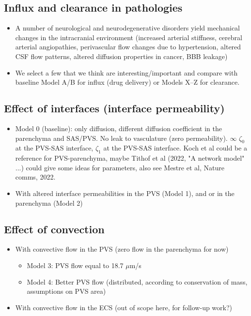 \documentclass[fleqn,10pt]{wlscirep}
\newcommand{\draft}[1]{\textcolor{gray}{#1}}
\begin{document}
\draft{\lipsum[1]}

\subsection*{Influx and clearance in pathologies}

\begin{itemize}
\item
  A number of neurological and neurodegenerative disorders yield mechanical changes in the intracranial environment (increased arterial stiffness, cerebral arterial angiopathies, perivascular flow changes due to hypertension, altered CSF flow patterns, altered diffusion properties in cancer, BBB leakage) 
\item
  We select a few that we think are interesting/important and compare with baseline Model A/B for influx (drug delivery) or Models X--Z for clearance.
\end{itemize}

\draft{\lipsum[1]}



\iffalse
\newpage
\subsection*{Effect of interfaces (interface permeability)}

\begin{itemize}
    \item Model 0 (baseline): only diffusion, different diffusion coefficient in the parenchyma and SAS/PVS. No leak to vasculature (zero permeability). $\infty$ $\zeta_0$ at the PVS-SAS interface, $\zeta_1$ at the PVS-SAS interface. Koch et al could be a reference for PVS-parenchyma, maybe Tithof et al (2022, "A network model" ...) could give some ideas for parameters, also see Mestre et al, Nature comms, 2022. 
    \item 
    With altered interface permeabilities in the PVS (Model 1), and or in the parenchyma (Model 2) 
    \end{itemize}

\begin{figure}
    \caption{}
    \label{fig:1}
\end{figure}

\subsection*{Effect of convection}
\begin{itemize}
    \item 
    With convective flow in the PVS (zero flow in the parenchyma for now)
    \begin{itemize}
        \item 
        Model 3: PVS flow equal to 18.7 $\mu$m/s
        \item 
        Model 4: Better PVS flow (distributed, according to conservation of mass, assumptions on PVS area)
    \end{itemize}    
    \item 
    With convective flow in the ECS (out of scope here, for follow-up work?)
\end{itemize}
\end{document}

